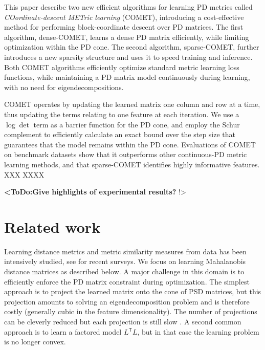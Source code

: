 \documentclass[twoside,11pt]{article}
\newcommand\todo[1]{\textbf{<ToDo:#1}!>}
\newcommand\mat[1]{{#1}}
\newcommand{\T}{{}^\mathsf{T}}
\newcommand{\ignore}[1]{}
\newcommand{\cholL}{\mat{L}}
\begin{document}
This paper describe two new efficient algorithms for learning PD metrics called {\em{COordinate-descent METric learning}} (COMET), introducing a cost-effective method for performing block-coordinate descent over PD  matrices. The first algorithm, dense-COMET, learns a dense PD matrix efficiently, while limiting optimization within the PD cone. The second algorithm, sparse-COMET, further introduces a new sparsity structure and uses it to speed training and inference. Both COMET algorithms  efficiently optimize standard metric learning loss functions, while maintaining a PD matrix model continuously during learning, with no need for eigendecompositions. 

COMET operates by updating the learned matrix one column and row at a time, thus updating the terms relating to one feature at each iteration. We use a $\log \det$ term as a barrier function for the PD cone, and employ the Schur complement to efficiently calculate an exact bound over the step size that guarantees that the model remains within the PD cone. Evaluations of COMET on benchmark datasets show that it outperforms other continuous-PD metric learning methods, and that sparse-COMET identifies highly informative features.  XXX XXXX 


\todo{Give highlights of experimental results? }

\ignore{Furthermore an important challenge for metric learning is the case where the set of features is not fixed in advance, but changes with time. This is a typical scenario in many real life applications of learning: as more data accumulates, it is possible to estimate more parameters accurately, so more features and signals are gradually added to existing systems. It is therefore desirable to develop algorithms that can learn metrics in face of a growing feature set. Our method naturally adapts to this setting, by optimizing the metric matrix one column-row at a time.}

\section{Related work}
Learning distance metrics and metric similarity measures from data has been intensively studied, see \citet{bellet2013survey, kulis2012survey} for recent surveys. We focus on learning Mahalanobis distance matrices as described below. A major challenge in this domain is to efficiently enforce the PD matrix constraint during optimization. The simplest approach is to project the learned matrix onto the cone of PSD matrices, but this projection amounts to solving an eigendecomposition problem and is therefore costly (generally cubic in the feature dimensionality). The number of projections can be cleverly reduced but each projection is still slow \citep{qianHD, qian}. A second common approach is to learn a factored model $\cholL\T \cholL$, but in that case the learning problem is no longer convex. 
\end{document}

